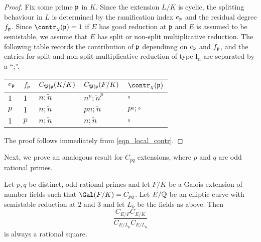 \begin{proof}
    Fix some prime $\mathfrak{p}$ in $K$. Since the extension $L/K$ is cyclic, the splitting behaviour in $L$ is determined by the ramification index $e_{\mathfrak{p}}$ and the residual degree $f_{\mathfrak{p}}$. Since $\contr_\chi(\pp)=1$ if $E$ has good reduction at $\mathfrak{p}$ and $E$ is assumed to be semistable, we assume that $E$ has split or non-split multiplicative reduction. The following table records the contribution of $\mathfrak{p}$ dependinng on $e_{\mathfrak{p}}$ and $f_{\mathfrak{p}}$, and the entries for split and non-split multiplicative reduction of type $\mathrm{I}_n$ are separated by a ``;''.
    \begin{table}[h!]
        \centering
        \begin{tabular}{|l|l|l|l|l|}
        \hline
        $e_{\mathfrak{p}}$ & $f_{\mathfrak{p}}$  & $C_{\mathfrak{P}\mid \mathfrak{p}}(K/K)$ & $C_{\mathfrak{P}\mid \mathfrak{p}}(F/K)$  & $\contr_\chi(\pp)$ \\ \hline
        $1$ & $1$ & $n;\tilde{n}$ & $n^p;\tilde{n}^p$ & $\square$ \\ \hline
        $p$ & $1$ & $n;\tilde{n}$ & $pn;\tilde{n}$ & $p\square;\square$ \\ \hline
        $1$ & $p$ & $n;\tilde{n}$ & $n;\tilde{n}$ & $\square$ \\ \hline
        \end{tabular}
    \end{table}
    The proof follows immediately from \eqref{eqn_local_contr}.
\end{proof}

Next, we prove an analogous result for $C_{pq}$ extensions, where $p$ and $q$ are odd rational primes.

\begin{lemma}\label{lem_Cpq}
    Let $p,q$ be distinct, odd rational primes and let $F/K$ be a Galois extension of number fields such that $\Gal(F/K)=C_{pq}$. Let $E/\mathbb{Q}$ be an elliptic curve with semistable reduction at $2$ and $3$ and let $L_k$ be the fields as above. Then
    $$\frac{C_{E/F}C_{E/K}}{C_{E/L_p}C_{E/L_q}}$$
    is always a rational square.
\end{lemma}

